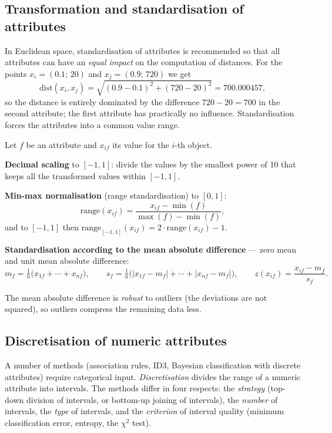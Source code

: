 \documentclass[11pt,a4paper]{article}
\theoremstyle{definition}
\begin{document}
\subsection{Transformation and standardisation of attributes}

In Euclidean space, standardisation of attributes is recommended so that all attributes can have
an \emph{equal impact} on the computation of distances. For the points $x_i=(0.1;\,20)$ and
$x_j=(0.9;\,720)$ we get
\[ \mathrm{dist}(x_i,x_j)=\sqrt{(0.9-0.1)^2+(720-20)^2}=700.000457, \]
so the distance is entirely dominated by the difference $720-20=700$ in the second attribute;
the first attribute has practically no influence. Standardisation forces the attributes into a
common value range.

\begin{defbox}
Let $f$ be an attribute and $x_{if}$ its value for the $i$-th object.

\textbf{Decimal scaling} to $[-1,1]$: divide the values by the smallest power of 10 that keeps
all the transformed values within $[-1,1]$.

\textbf{Min-max normalisation} (range standardisation) to $[0,1]$:
\[ \mathrm{range}(x_{if})=\frac{x_{if}-\min(f)}{\max(f)-\min(f)}, \]
and to $[-1,1]$ then $\mathrm{range}_{[-1,1]}(x_{if})=2\cdot \mathrm{range}(x_{if})-1$.

\textbf{Standardisation according to the mean absolute difference} --- zero mean and unit mean
absolute difference:
\[ m_f=\tfrac1n\big(x_{1f}+\cdots+x_{nf}\big),\qquad
s_f=\tfrac1n\big(|x_{1f}-m_f|+\cdots+|x_{nf}-m_f|\big),\qquad
z(x_{if})=\frac{x_{if}-m_f}{s_f}. \]
\end{defbox}

The mean absolute difference is \emph{robust} to outliers (the deviations are not squared), so
outliers compress the remaining data less.

\subsection{Discretisation of numeric attributes}

A number of methods (association rules, ID3, Bayesian classification with discrete
attributes) require categorical input. \emph{Discretisation} divides the range of a numeric
attribute into intervals. The methods differ in four respects: the \emph{strategy} (top-down
division of intervals, or bottom-up joining of intervals), the \emph{number} of intervals, the
\emph{type} of intervals, and the \emph{criterion} of interval quality (minimum classification
error, entropy, the $\chi^2$ test).
\end{document}
